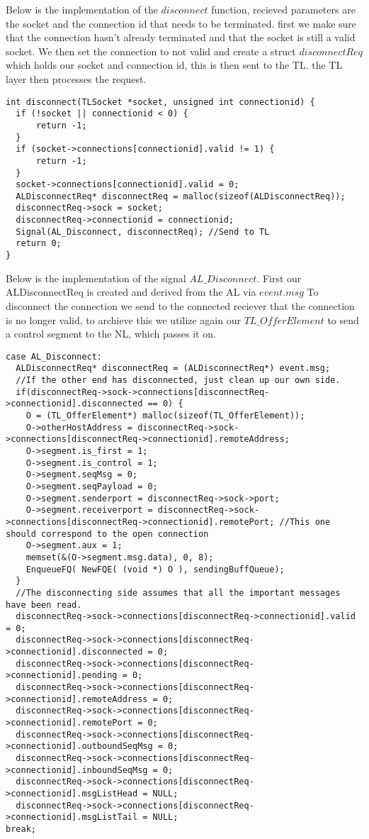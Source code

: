 Below is the implementation of the $disconnect$ function, recieved parameters are the socket and the connection id that needs to be terminated.
first we make sure that the connection hasn't already terminated and that the socket is still a valid socket.
We then set the connection to not valid and create a struct $disconnectReq$ which holds our socket and connection id, this is then sent to the TL.
the TL layer then processes the request.
\begin{lstlisting}
int disconnect(TLSocket *socket, unsigned int connectionid) {
  if (!socket || connectionid < 0) {
      return -1;
  }
  if (socket->connections[connectionid].valid != 1) {
      return -1;
  }
  socket->connections[connectionid].valid = 0;
  ALDisconnectReq* disconnectReq = malloc(sizeof(ALDisconnectReq));
  disconnectReq->sock = socket;
  disconnectReq->connectionid = connectionid;
  Signal(AL_Disconnect, disconnectReq); //Send to TL
  return 0;
}
\end{lstlisting}


Below is the implementation of the signal $AL\_Disconnect$.
First our ALDisconnectReq is created and derived from the AL via $event.msg$
To disconnect the connection we send to the connected reciever that the connection is no longer valid, to archieve this
we utilize again our $TL\_OfferElement$ to send a control segment to the NL, which passes it on.
\begin{lstlisting}
case AL_Disconnect:
  ALDisconnectReq* disconnectReq = (ALDisconnectReq*) event.msg;
  //If the other end has disconnected, just clean up our own side.
  if(disconnectReq->sock->connections[disconnectReq->connectionid].disconnected == 0) {
    O = (TL_OfferElement*) malloc(sizeof(TL_OfferElement));
    O->otherHostAddress = disconnectReq->sock->connections[disconnectReq->connectionid].remoteAddress;
    O->segment.is_first = 1;
    O->segment.is_control = 1;
    O->segment.seqMsg = 0;
    O->segment.seqPayload = 0;
    O->segment.senderport = disconnectReq->sock->port;
    O->segment.receiverport = disconnectReq->sock->connections[disconnectReq->connectionid].remotePort; //This one should correspond to the open connection
    O->segment.aux = 1;
    memset(&(O->segment.msg.data), 0, 8);
    EnqueueFQ( NewFQE( (void *) O ), sendingBuffQueue);
  }
  //The disconnecting side assumes that all the important messages have been read.
  disconnectReq->sock->connections[disconnectReq->connectionid].valid = 0;
  disconnectReq->sock->connections[disconnectReq->connectionid].disconnected = 0;
  disconnectReq->sock->connections[disconnectReq->connectionid].pending = 0;
  disconnectReq->sock->connections[disconnectReq->connectionid].remoteAddress = 0;
  disconnectReq->sock->connections[disconnectReq->connectionid].remotePort = 0;
  disconnectReq->sock->connections[disconnectReq->connectionid].outboundSeqMsg = 0;
  disconnectReq->sock->connections[disconnectReq->connectionid].inboundSeqMsg = 0;
  disconnectReq->sock->connections[disconnectReq->connectionid].msgListHead = NULL;
  disconnectReq->sock->connections[disconnectReq->connectionid].msgListTail = NULL;
break;
\end{lstlisting}

